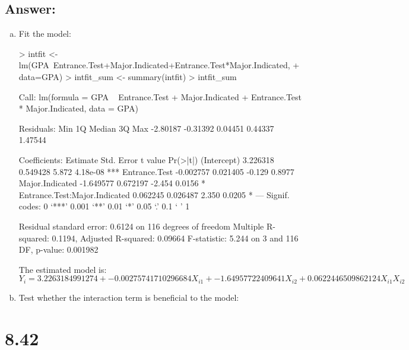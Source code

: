 \documentclass{article}
\begin{document}
\subsection{Answer:}

\begin{enumerate}[a)]
\item{} Fit the model:

\begin{Schunk}
\begin{Sinput}
> intfit <- lm(GPA~Entrance.Test+Major.Indicated+Entrance.Test*Major.Indicated,
+              data=GPA)
> intfit_sum <- summary(intfit)
> intfit_sum
\end{Sinput}
\begin{Soutput}
Call:
lm(formula = GPA ~ Entrance.Test + Major.Indicated + Entrance.Test * 
    Major.Indicated, data = GPA)

Residuals:
     Min       1Q   Median       3Q      Max 
-2.80187 -0.31392  0.04451  0.44337  1.47544 

Coefficients:
                               Estimate Std. Error t value Pr(>|t|)    
(Intercept)                    3.226318   0.549428   5.872 4.18e-08 ***
Entrance.Test                 -0.002757   0.021405  -0.129   0.8977    
Major.Indicated               -1.649577   0.672197  -2.454   0.0156 *  
Entrance.Test:Major.Indicated  0.062245   0.026487   2.350   0.0205 *  
---
Signif. codes:  0 ‘***’ 0.001 ‘**’ 0.01 ‘*’ 0.05 ‘.’ 0.1 ‘ ’ 1

Residual standard error: 0.6124 on 116 degrees of freedom
Multiple R-squared:  0.1194,	Adjusted R-squared:  0.09664 
F-statistic: 5.244 on 3 and 116 DF,  p-value: 0.001982
\end{Soutput}
\end{Schunk}

The estimated model is:
$$ Y_i = 3.2263184991274 + -0.00275741710296684X_{i1} + -1.64957722409641X_{i2} + 0.0622446509862124X_{i1}X_{i2} $$

\item{} Test whether the interaction term is beneficial to the model:




\end{enumerate}

\section{8.42}
\end{document}
